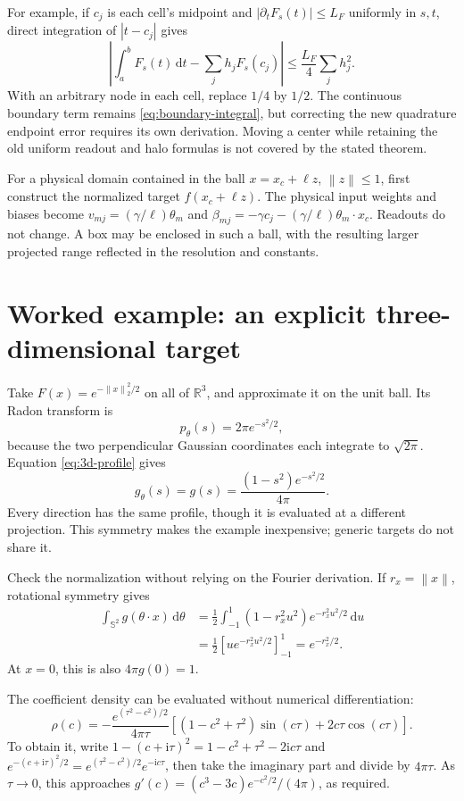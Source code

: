 \documentclass[11pt]{article}
\newcommand{\R}{\mathbb R}
\newcommand{\ii}{\mathrm i}
\newcommand{\dd}{\,\mathrm d}
\newcommand{\norm}[1]{\left\lVert#1\right\rVert}
\begin{document}
For example, if $c_j$ is each cell's midpoint and $|\partial_tF_s(t)|\le L_F$ uniformly in $s,t$, direct integration of $|t-c_j|$ gives
\[
 \left|\int_a^bF_s(t)\dd t-\sum_j h_jF_s(c_j)\right|
 \le\frac{L_F}{4}\sum_jh_j^2.
\]
With an arbitrary node in each cell, replace $1/4$ by $1/2$. The continuous boundary term remains \eqref{eq:boundary-integral}, but correcting the new quadrature endpoint error requires its own derivation. Moving a center while retaining the old uniform readout and halo formulas is not covered by the stated theorem.

For a physical domain contained in the ball $x=x_c+\ell z$, $\norm z\le1$, first construct the normalized target $f(x_c+\ell z)$. The physical input weights and biases become
$v_{mj}=(\gamma/\ell)\theta_m$ and
$\beta_{mj}=-\gamma c_j-(\gamma/\ell)\theta_m\cdot x_c$.
Readouts do not change. A box may be enclosed in such a ball, with the resulting larger projected range reflected in the resolution and constants.

\section{Worked example: an explicit three-dimensional target}

Take $F(x)=e^{-\norm{x}_2^2/2}$ on all of $\R^3$, and approximate it on the unit ball. Its Radon transform is
\[
 p_\theta(s)=2\pi e^{-s^2/2},
\]
because the two perpendicular Gaussian coordinates each integrate to $\sqrt{2\pi}$. Equation \eqref{eq:3d-profile} gives
\begin{equation}
 g_\theta(s)=g(s)=\frac{(1-s^2)e^{-s^2/2}}{4\pi}.
 \label{eq:gaussian-profile}
\end{equation}
Every direction has the same profile, though it is evaluated at a different projection. This symmetry makes the example inexpensive; generic targets do not share it.

Check the normalization without relying on the Fourier derivation. If $r_x=\norm{x}$, rotational symmetry gives
\begin{align*}
 \int_{\mathbb S^2}g(\theta\cdot x)\dd\theta
 &=\frac12\int_{-1}^1(1-r_x^2u^2)e^{-r_x^2u^2/2}\dd u\\
 &=\frac12[u e^{-r_x^2u^2/2}]_{-1}^1
 =e^{-r_x^2/2}.
\end{align*}
At $x=0$, this is also $4\pi g(0)=1$.

The coefficient density can be evaluated without numerical differentiation:
\begin{equation}
 \rho(c)=-\frac{e^{(\tau^2-c^2)/2}}{4\pi\tau}
 \left[(1-c^2+\tau^2)\sin(c\tau)+2c\tau\cos(c\tau)\right].
 \label{eq:gaussian-density}
\end{equation}
To obtain it, write
$1-(c+\ii\tau)^2=1-c^2+\tau^2-2\ii c\tau$ and
$e^{-(c+\ii\tau)^2/2}=e^{(\tau^2-c^2)/2}e^{-\ii c\tau}$, then take the imaginary part and divide by $4\pi\tau$. As $\tau\to0$, this approaches
$g'(c)=(c^3-3c)e^{-c^2/2}/(4\pi)$, as required.
\end{document}
